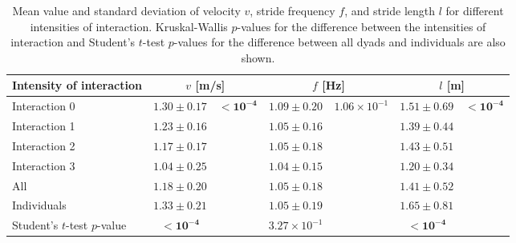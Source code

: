 \begin{table}

\centering
\caption{Mean value and standard deviation of velocity $v$, stride frequency $f$, and stride length $l$ for different intensities of interaction. Kruskal-Wallis $p$-values for the difference between the intensities of interaction and Student's $t$-test $p$-values for the difference between all dyads and individuals are also shown.}
\label{tab:gait_stats}
\begin{tabular}{lcccccc}
\toprule
Intensity of interaction & \multicolumn{2}{c}{$v$ [m/s]} & \multicolumn{2}{c}{$f$ [Hz]} & \multicolumn{2}{c}{$l$ [m]} \\
\midrule
Interaction 0 & $1.30 \pm 0.17$ & \multirow{4}{*}{$\mathbf{< 10^{-4}}$} &$1.09 \pm 0.20$ & \multirow{4}{*}{$1.06 \times 10^{-1}$} &$1.51 \pm 0.69$ & \multirow{4}{*}{$\mathbf{< 10^{-4}}$} \\
Interaction 1 & $1.23 \pm 0.16$ & &$1.05 \pm 0.16$ & &$1.39 \pm 0.44$ & \\
Interaction 2 & $1.17 \pm 0.17$ & &$1.05 \pm 0.18$ & &$1.43 \pm 0.51$ & \\
Interaction 3 & $1.04 \pm 0.25$ & &$1.04 \pm 0.15$ & &$1.20 \pm 0.34$ & \\
\midrule
All & $1.18 \pm 0.20$ & &$1.05 \pm 0.18$ & &$1.41 \pm 0.52$ &\\
Individuals & $1.33 \pm 0.21$ & & $1.05 \pm 0.19$ & &$1.65 \pm 0.81$  & \\
\midrule
Student's $t$-test $p$-value & $\mathbf{< 10^{-4}}$ & &$3.27 \times 10^{-1}$ & &$\mathbf{< 10^{-4}}$ &\\
\bottomrule
\end{tabular}
\end{table}
